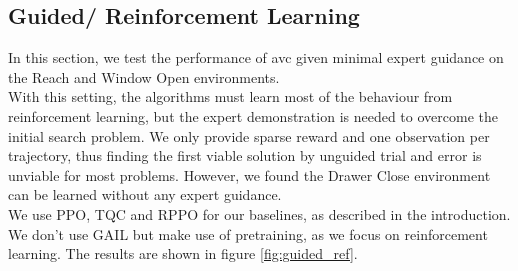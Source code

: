 \subsection{Guided/ Reinforcement Learning}
\label{sec:g_ref_ler}
In this section, we test the performance of \ac{avc} given minimal expert guidance on the Reach and Window Open environments. \\
With this setting, the algorithms must learn most of the behaviour from reinforcement learning, but the expert
demonstration is needed to overcome the initial search problem. We only provide sparse reward and one observation per trajectory, thus finding the first viable solution by unguided
trial and error is unviable for most problems. However, we found the Drawer Close environment can be learned without any expert guidance.\\

We use PPO, TQC and RPPO for our baselines, as described in the introduction. We don't use GAIL but make use of pretraining, as we focus on reinforcement learning. The results
are shown in figure \ref{fig:guided_ref}.\\

